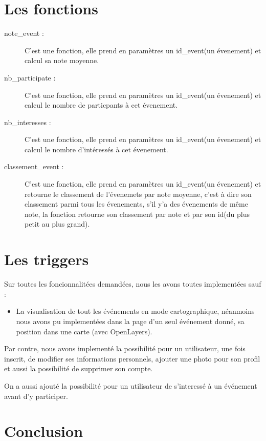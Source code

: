 \documentclass[oneside,11pt,a4paper]{article}
\begin{document}
\section{Les fonctions}
\begin{description}
	
	\item[note\_event : ] C'est une fonction, elle prend en paramètres un id\_event(un évenement) et calcul sa note moyenne.
	
	\item[nb\_participate : ] C'est une fonction, elle prend en paramètres un id\_event(un évenement) et calcul le nombre de particpants à cet évenement.
	
	\item[nb\_interesses : ] C'est une fonction, elle prend en paramètres un id\_event(un évenement) et calcul le nombre d'intéressés à cet évenement.
	\item[classement\_event : ] C'est une fonction, elle prend en paramètres un id\_event(un évenement) et retourne le classement de l'évenemets par note moyenne, c'est à dire son classement parmi tous les évenements, s'il y'a des évenements de même note, la fonction retourne son classement par note et par son id(du plus petit au plus grand).
	
	
\end{description}
\section{Les triggers}

Sur toutes les foncionnalitées demandées, nous les avons toutes implementées sauf :

\begin{itemize}
  \item La visualisation de tout les événements en mode cartographique, néanmoins nous avons pu implementées dans la page d'un seul événement donné, sa position dans une carte (avec OpenLayers).
\end{itemize}

Par contre, nous avons implementé la possibilité pour un utilisateur, une fois inscrit, de modifier ses informations personnels, ajouter une photo pour son profil et aussi la possibilité de supprimer son compte.

On a aussi ajouté la possibilité pour un utilisateur de s'interessé à un événement avant d'y participer.


\section{Conclusion}
\end{document}
